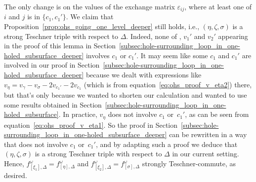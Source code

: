 \documentclass[pdftex]{sigma}
\numberwithin{equation}{section}
\theoremstyle{definition}
\begin{document}
The only change is on the values of the exchange matrix $\varepsilon_{ij}$, where at least one of $i$ and $j$ is in $\{c_1,c_1'\}$. We claim that Proposition~\ref{prop:ohs_going_one_level_deeper} still holds, i.e., $(\eta,\zeta,\sigma)$ is a strong Teschner triple with respect to $\Delta$. Indeed, none of , $v_1'$ and $v_2'$ appearing in the proof of this lemma in Section~\ref{subsec:hole-surrounding_loop_in_one-holed_subsurface_deeper} involves $c_1$ or $c_1'$. It may seem like some $c_1$ and $c_1'$ are involved in our proof in Section~\ref{subsec:hole-surrounding_loop_in_one-holed_subsurface_deeper} because we dealt with expressions like $v_\eta = v_\gamma - v_\sigma - 2v_{c_1'} - 2v_{c_1}$ (which is from equation~\eqref{eq:ohs_proof_v_eta2}) there, but that's only because we wanted to shorten our calculation and wanted to use some results obtained in Section~\ref{subsec:hole-surrounding_loop_in_one-holed_subsurface}. In practice, $v_\eta$ does not involve $c_1$ or~$c_1'$, as can be seen from equation~\eqref{eq:ohs_proof_v_eta1}. So the proof in Section~\ref{subsec:hole-surrounding_loop_in_one-holed_subsurface_deeper} can be rewritten in a way that does not involve $c_1$ or~$c_1'$, and by adapting such a proof we deduce that $(\eta,\zeta,\sigma)$ is a strong Teschner triple with respect to $\Delta$ in our current setting. Hence, $f^\omega_{[\xi_1],\Delta} = f^\omega_{[\eta],\Delta}$ and $f^\omega_{[\xi_2],\Delta} = f^\omega_{[\sigma],\Delta}$ strongly Teschner-commute, as desired.
\end{document}
